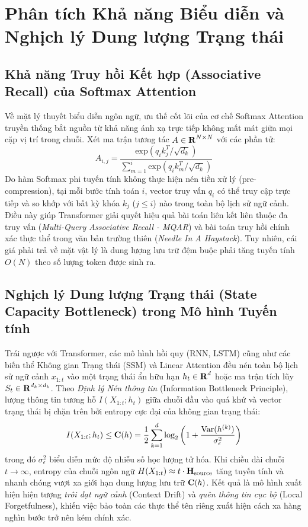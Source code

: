 \documentclass{uetgraduation}
\renewcommand{\mathbb}[1]{\text{\textbf{#1}}}
\renewcommand{\mathcal}[1]{\text{\textbf{#1}}}
\renewcommand{\exp}{\text{exp}}
\renewcommand{\log}{\text{log}}
\begin{document}
\section{Phân tích Khả năng Biểu diễn và Nghịch lý Dung lượng Trạng thái}
\subsection{Khả năng Truy hồi Kết hợp (Associative Recall) của Softmax Attention}
Về mặt lý thuyết biểu diễn ngôn ngữ, ưu thế cốt lõi của cơ chế Softmax Attention truyền thống bắt nguồn từ khả năng ánh xạ trực tiếp không mất mát giữa mọi cặp vị trí trong chuỗi. Xét ma trận tương tác $A \in \mathbb{R}^{N \times N}$ với các phần tử:
\begin{equation}
A_{i,j} = \frac{\exp(q_i k_j^T / \sqrt{d_k})}{\sum_{m=1}^i \exp(q_i k_m^T / \sqrt{d_k})}
\end{equation}
Do hàm Softmax phi tuyến tính không thực hiện nén tiền xử lý (pre-compression), tại mỗi bước tính toán $i$, vector truy vấn $q_i$ có thể truy cập trực tiếp và so khớp với bất kỳ khóa $k_j$ ($j \le i$) nào trong toàn bộ lịch sử ngữ cảnh. Điều này giúp Transformer giải quyết hiệu quả bài toán liên kết liên thuộc đa truy vấn (\textit{Multi-Query Associative Recall - MQAR}) và bài toán truy hồi chính xác thực thể trong văn bản trường thiên (\textit{Needle In A Haystack}). Tuy nhiên, cái giá phải trả về mặt vật lý là dung lượng lưu trữ đệm buộc phải tăng tuyến tính $O(N)$ theo số lượng token được sinh ra.

\subsection{Nghịch lý Dung lượng Trạng thái (State Capacity Bottleneck) trong Mô hình Tuyến tính}
Trái ngược với Transformer, các mô hình hồi quy (RNN, LSTM) cũng như các biến thể Không gian Trạng thái (SSM) và Linear Attention đều nén toàn bộ lịch sử ngữ cảnh $x_{1:t}$ vào một trạng thái ẩn hữu hạn $h_t \in \mathbb{R}^d$ hoặc ma trận tích lũy $S_t \in \mathbb{R}^{d_k \times d_k}$. Theo \textit{Định lý Nén thông tin} (Information Bottleneck Principle), lượng thông tin tương hỗ $I(X_{1:t}; h_t)$ giữa chuỗi đầu vào quá khứ và vector trạng thái bị chặn trên bởi entropy cực đại của không gian trạng thái:
\begin{equation}
I(X_{1:t}; h_t) \le \mathcal{C}(h) = \frac{1}{2} \sum_{k=1}^d \log_2 \left( 1 + \frac{\text{Var}(h^{(k)})}{\sigma_{\epsilon}^2} \right)
\end{equation}
trong đó $\sigma_{\epsilon}^2$ biểu diễn mức độ nhiễu số học lượng tử hóa. Khi chiều dài chuỗi $t \to \infty$, entropy của chuỗi ngôn ngữ $H(X_{1:t}) \approx t \cdot \mathcal{H}_{\text{source}}$ tăng tuyến tính và nhanh chóng vượt xa giới hạn dung lượng lưu trữ $\mathcal{C}(h)$. Kết quả là mô hình xuất hiện hiện tượng \textit{trôi dạt ngữ cảnh} (Context Drift) và \textit{quên thông tin cục bộ} (Local Forgetfulness), khiến việc bảo toàn các thực thể tên riêng xuất hiện cách xa hàng nghìn bước trở nên kém chính xác.
\end{document}
